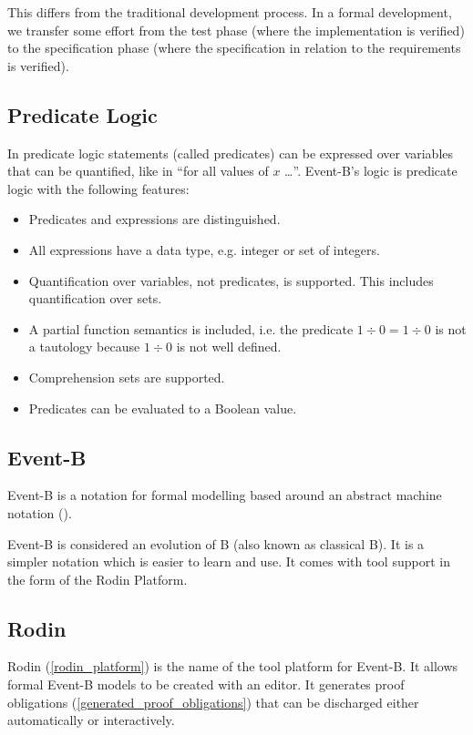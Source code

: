 This differs from the traditional development process. In a formal development, we transfer some effort from the test phase (where the implementation is verified) to the specification phase (where the specification in relation to the requirements is verified).

\subsection{Predicate Logic}
\label{tut_predicate_logic}

In predicate logic statements (called predicates) can be expressed over variables
  that can be quantified, like in ``for all values of $x$ \ldots''.
Event-B's logic is predicate logic with the following features:
\begin{itemize}
\item Predicates and expressions are distinguished.
\item All expressions have a data type, e.g. integer or set of integers.
\item Quantification over variables, not predicates, is supported.
  This includes quantification over sets.
\item A partial function semantics is included, i.e. the predicate $1\div 0 = 1\div 0$ is not
  a tautology because $1\div 0$ is not well defined.
\item Comprehension sets are supported.
\item Predicates can be evaluated to a Boolean value.
\end{itemize}

\subsection{Event-B}
\label{tut_eventb}

Event-B is a notation for formal modelling based around an abstract machine notation ().

Event-B is considered an evolution of B (also known as classical B). It is a simpler notation which is easier to learn and use. It comes with tool support in the form of the Rodin Platform.

\subsection{Rodin}
\label{tut_rodin}

Rodin (\ref{rodin_platform}) is the name of the tool platform for Event-B.  It allows formal Event-B models to be created with an editor.  It generates proof obligations (\ref{generated_proof_obligations}) that can be discharged either automatically or interactively.

